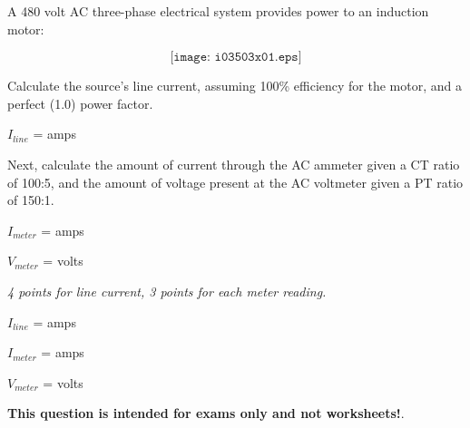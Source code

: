 

A 480 volt AC three-phase electrical system provides power to an induction motor:

$$\texttt{[image: i03503x01.eps]}$$

Calculate the source's line current, assuming 100\% efficiency for the motor, and a perfect (1.0) power factor.

\vskip 10pt

$I_{line}$ = \underbar{\hskip 50pt} amps

\vskip 50pt

Next, calculate the amount of current through the AC ammeter given a CT ratio of 100:5, and the amount of voltage present at the AC voltmeter given a PT ratio of 150:1.

\vskip 10pt

$I_{meter}$ = \underbar{\hskip 50pt} amps

\vskip 10pt

$V_{meter}$ = \underbar{\hskip 50pt} volts







{\it 4 points for line current, 3 points for each meter reading.}

\vskip 10pt

$I_{line}$ =  amps

\vskip 10pt

$I_{meter}$ =  amps

\vskip 10pt

$V_{meter}$ =  volts







{\bf This question is intended for exams only and not worksheets!}.


